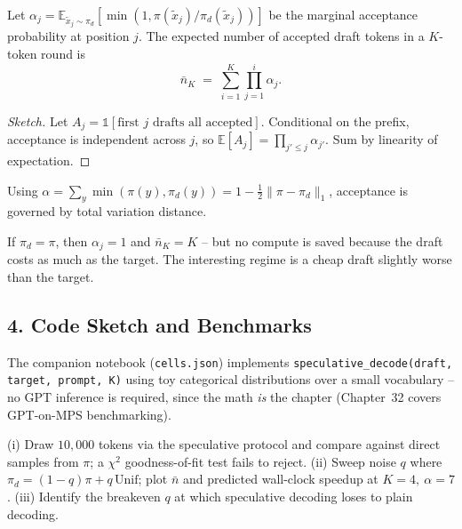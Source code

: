 \begin{proposition}\label{prop:expected}
Let $\alpha_j = \mathbb{E}_{\tilde x_j \sim \pi_d}[\min(1, \pi(\tilde x_j)/\pi_d(\tilde x_j))]$ be the marginal acceptance probability at position $j$. The expected number of accepted draft tokens in a $K$-token round is
\[
\bar n_K \;=\; \sum_{i=1}^{K} \prod_{j=1}^{i} \alpha_j.
\]
\end{proposition}

\begin{proof}[Sketch]
Let $A_j = \mathbb{1}[\text{first }j\text{ drafts all accepted}]$. Conditional on the prefix, acceptance is independent across $j$, so $\mathbb{E}[A_j] = \prod_{j'\le j}\alpha_{j'}$. Sum by linearity of expectation. \qedhere
\end{proof}

\begin{remark}
Using $\alpha = \sum_y \min(\pi(y), \pi_d(y)) = 1 - \tfrac{1}{2}\|\pi - \pi_d\|_1$, acceptance is governed by total variation distance.
\end{remark}

\begin{corollary}\label{cor:optimal}
If $\pi_d = \pi$, then $\alpha_j = 1$ and $\bar n_K = K$ -- but no compute is saved because the draft costs as much as the target. The interesting regime is a cheap draft slightly worse than the target.
\end{corollary}

\subsection*{4. Code Sketch and Benchmarks}

The companion notebook (\texttt{cells.json}) implements \texttt{speculative\_decode(draft, target, prompt, K)} using toy categorical distributions over a small vocabulary -- no GPT inference is required, since the math \emph{is} the chapter (Chapter~32 covers GPT-on-MPS benchmarking).

\begin{example}[Experiments]
(i) Draw $10{,}000$ tokens via the speculative protocol and compare against direct samples from $\pi$; a $\chi^2$ goodness-of-fit test fails to reject. (ii) Sweep noise $q$ where $\pi_d = (1-q)\pi + q\,\mathrm{Unif}$; plot $\bar n$ and predicted wall-clock speedup at $K=4,\ \alpha=7$. (iii) Identify the breakeven $q$ at which speculative decoding loses to plain decoding.
\end{example}

